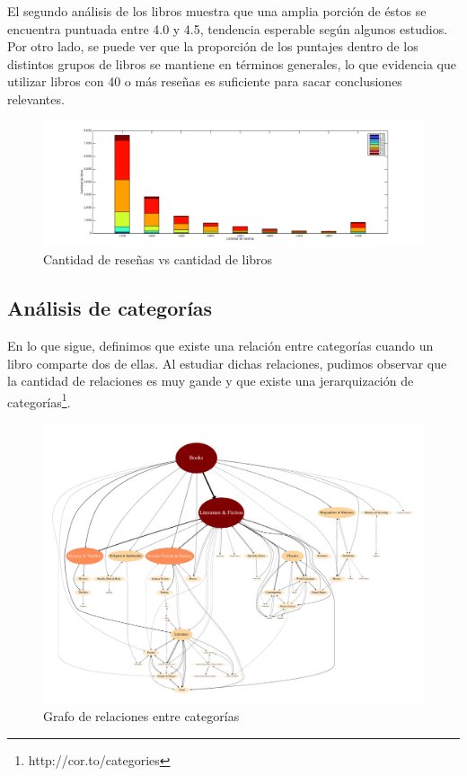 \documentclass[12pt,journal,compsoc]{IEEEtran}
\begin{document}
El segundo análisis de los libros muestra que una amplia porción de éstos se encuentra puntuada entre 4.0 y 4.5, tendencia esperable según algunos estudios\cite{zhang}. Por otro lado, se puede ver que la proporción de los puntajes dentro de los distintos grupos de libros se mantiene en términos generales, lo que evidencia que utilizar libros con 40 o más reseñas es suficiente para sacar conclusiones relevantes.

\begin{figure}[H]
  \includegraphics[width=7.0in]{imgs/cantLibrosVScantReviews.png}
  \caption{Cantidad de reseñas vs cantidad de libros}
\end{figure}
\newpage
\subsection{Análisis de categorías}

En lo que sigue, definimos que existe una relación entre categorías cuando un libro comparte dos de ellas. Al estudiar dichas relaciones, pudimos observar que la cantidad de relaciones es muy gande y que existe una jerarquización de categorías\footnote{http://cor.to/categories}.

\begin{figure}[H]
  \centering
  \includegraphics[width=7.0in]{../results/graph.pdf}
  \caption{Grafo de relaciones entre categorías}
\end{figure}
\end{document}
